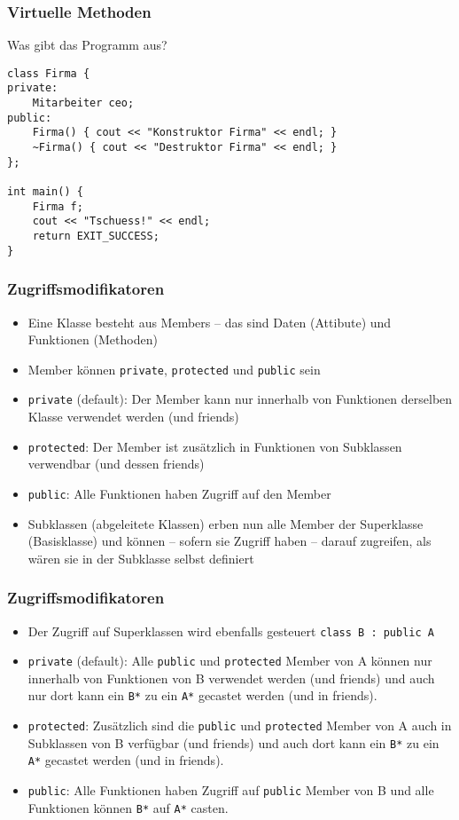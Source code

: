 \documentclass[]{beamer}
\newcommand{\bi}{\begin{itemize}}
\newcommand{\ei}{\end{itemize}}
\begin{document}
\begin{frame}[fragile]
	\frametitle{Virtuelle Methoden}
	Was gibt das Programm aus?
	\footnotesize
	\begin{lstlisting}
class Firma {
private:
	Mitarbeiter ceo;
public:
	Firma() { cout << "Konstruktor Firma" << endl; }
	~Firma() { cout << "Destruktor Firma" << endl; }
};
	
int main() {
	Firma f;
	cout << "Tschuess!" << endl;
	return EXIT_SUCCESS;
}
	\end{lstlisting}
\end{frame}


\begin{frame}[fragile]
	\frametitle{Zugriffsmodifikatoren}
	\bi
	\item Eine Klasse besteht aus Members -- das sind Daten \newline(Attibute) und Funktionen (Methoden)
	\item Member können \lstinline|private|, \lstinline|protected| und \lstinline|public| sein
	\item \lstinline|private| (default): Der Member kann nur innerhalb von Funktionen derselben Klasse verwendet werden (und friends)
	\item \lstinline|protected|: Der Member ist zusätzlich in Funktionen von Subklassen verwendbar (und dessen friends)
	\item \lstinline|public|: Alle Funktionen haben Zugriff auf den Member
	\item Subklassen (abgeleitete Klassen) erben nun alle Member der Superklasse (Basisklasse) und können -- sofern sie Zugriff haben -- darauf zugreifen, als wären sie in der Subklasse selbst definiert
	\ei
\end{frame}

\begin{frame}
	\frametitle{Zugriffsmodifikatoren}
	\bi
	\item Der Zugriff auf Superklassen wird ebenfalls gesteuert\newline
	\lstinline|class B : public A|
	\item \lstinline|private| (default): Alle \lstinline|public| und \lstinline|protected| Member von A können nur innerhalb von Funktionen von B verwendet werden (und friends) und auch nur dort kann ein \lstinline|B*| zu ein \lstinline|A*| gecastet werden (und in friends).
	\item \lstinline|protected|: Zusätzlich sind die \lstinline|public| und \lstinline|protected| Member von A auch in Subklassen von B verfügbar (und friends) und auch dort kann ein \lstinline|B*| zu ein \lstinline|A*| gecastet werden (und in friends).
	\item \lstinline|public|: Alle Funktionen haben Zugriff auf \lstinline|public| Member von B und alle Funktionen können \lstinline|B*| auf \lstinline|A*| casten.
	\ei
\end{frame}
\end{document}
